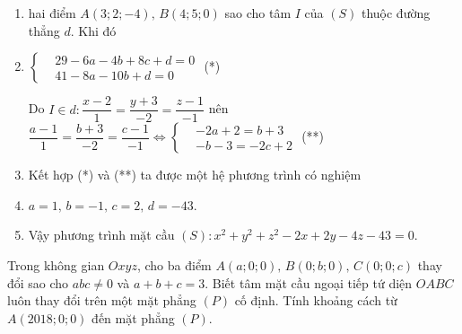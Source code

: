 \begin{vd}
{\begin{enumerate}
			\item[] hai điểm $A(3;2;-4),\,B(4;5;0)$ sao cho tâm $I$ của $(S)$ thuộc đường thẳng $d$. Khi đó
			\item[] \centerline{$\left\{\begin{aligned}
				&29-6a-4b+8c+d=0 \\
				&41-8a-10b+d=0
				\end{aligned}\right. $ (*)}
			Do $I\in d:\dfrac{x-2}{1}=\dfrac{y+3}{-2}=\dfrac{z-1}{-1}$ nên $\dfrac{a-1}{1}=\dfrac{b+3}{-2}=\dfrac{c-1}{-1} \Leftrightarrow \left\{\begin{aligned}
			&-2a+2=b+3 \\
			&-b-3=-2c+2
			\end{aligned}\right. $
			(**)
			\item[] Kết hợp (*) và (**) ta được một hệ phương trình có nghiệm
			\item[] \centerline{$a=1,\,b=-1,\,c=2,\,d=-43$.}\vspace{-0.8cm}
			\item[] Vậy phương trình mặt cầu $(S)\colon x^2+y^2+z^2-2x+2y-4z-43=0$.
		\end{enumerate}
	}
\end{vd}
\begin{vd}
	Trong không gian $Oxyz$, cho ba điểm $A(a;0;0),\,B(0;b;0),\,C(0;0;c)$ thay đổi sao cho $abc \neq 0$ và $a+b+c=3$. Biết tâm mặt cầu ngoại tiếp tứ diện $OABC$ luôn thay đổi trên một mặt phẳng $(P)$ cố định. Tính khoảng cách từ $A(2018;0;0)$ đến mặt phẳng $(P)$.
\end{vd}
